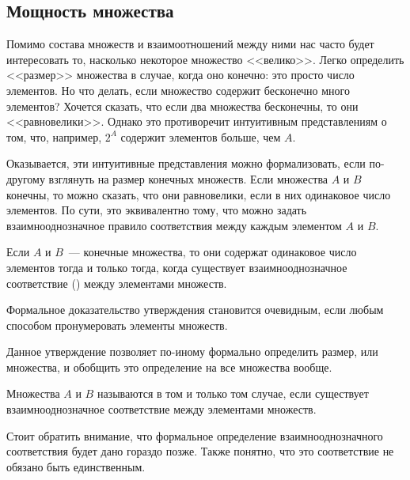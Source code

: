 \iffalse
\subsection{Мощность множества}
\label{subsec:sets:cardinality}

Помимо состава множеств и взаимоотношений между ними нас часто будет интересовать то, насколько некоторое множество <<велико>>.
Легко определить <<размер>> множества в случае, когда оно конечно: это просто число элементов.
Но что делать, если множество содержит бесконечно много элементов?
Хочется сказать, что если два множества бесконечны, то они <<равновелики>>.
Однако это противоречит интуитивным представлениям о том, что, например, $ 2^A $ содержит элементов больше, чем $ A $.

Оказывается, эти интуитивные представления можно формализовать, если по-другому взглянуть на размер конечных множеств.
Если множества $ A $ и $ B $ конечны, то можно сказать, что они равновелики, если в них одинаковое число элементов.
По сути, это эквивалентно тому, что можно задать взаимнооднозначное правило соответствия между каждым элементом $ A $ и $ B $.

\begin{statement}
    Если $ A $ и $ B $~--- конечные множества, то они содержат одинаковое число элементов тогда и только тогда,
    когда существует взаимнооднозначное соответствие () между элементами множеств.
\end{statement}

Формальное доказательство утверждения становится очевидным, если любым способом пронумеровать элементы множеств.

Данное утверждение позволяет по-иному формально определить размер, или  множества, и обобщить это определение на все множества вообще.
\begin{definition}
    Множества $ A $ и $ B $ называются  в том и только том случае,
    если существует взаимнооднозначное соответствие между элементами множеств.
\end{definition}
Стоит обратить внимание, что формальное определение взаимнооднозначного соответствия будет дано гораздо позже.
Также понятно, что это соответствие не обязано быть единственным.

